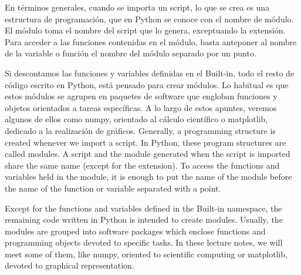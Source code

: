 \begin{paracol}{2}
En términos generales, cuando se importa un script, lo que se crea es una estructura de programación, que en Python se conoce con el nombre de módulo. El módulo toma el nombre del script que lo genera, exceptuando la extensión. Para acceder a las funciones contenidas en el módulo, basta anteponer al nombre de la variable o función el nombre del módulo separado por un punto.

Si descontamos las funciones y variables definidas en el Built-in, todo el resto de código escrito en Python, está pensado para crear módulos. Lo habitual es que estos módulos se agrupen en paquetes de software que engloban funciones y objetos orientados a tareas específicas. A lo largo de estos apuntes, veremos algunos de ellos como numpy, orientado al cálculo científico o matplotlib, dedicado a la realización de gráficos.
\switchcolumn
Generally, a programming structure is created whenever we import a script. In Python, these program structures are called modules. A  script and the module generated when the script is imported share the same name (except for the extension). To access the functions and 
variables held in the module, it is enough to put the name of the module before the name of the function or variable separated with a point.

Except for the functions and variables defined in the Built-in namespace, the remaining code written in Python is intended to create modules. Usually, the modules are grouped into software packages which enclose functions and programming objects devoted to specific tasks. In these lecture notes, we will meet some of them, like numpy, oriented to scientific computing or matplotlib, devoted to graphical representation.    
\end{paracol}

